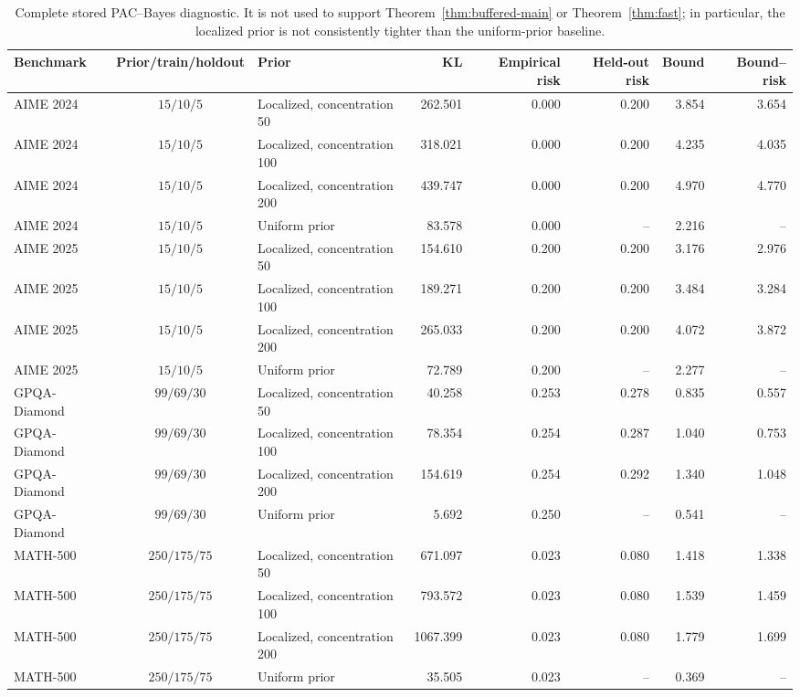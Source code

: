 \begin{table}[p]
\centering
\scriptsize
\setlength{\tabcolsep}{3.5pt}
\begin{tabular}{lclrrrrr}
\toprule
Benchmark & Prior/train/holdout & Prior & KL & Empirical risk & Held-out risk & Bound & Bound--risk \\
\midrule
AIME 2024 & \(15/10/5\) & Localized, concentration 50 & 262.501 & 0.000 & 0.200 & 3.854 & 3.654 \\
AIME 2024 & \(15/10/5\) & Localized, concentration 100 & 318.021 & 0.000 & 0.200 & 4.235 & 4.035 \\
AIME 2024 & \(15/10/5\) & Localized, concentration 200 & 439.747 & 0.000 & 0.200 & 4.970 & 4.770 \\
AIME 2024 & \(15/10/5\) & Uniform prior & 83.578 & 0.000 & -- & 2.216 & -- \\
\midrule
AIME 2025 & \(15/10/5\) & Localized, concentration 50 & 154.610 & 0.200 & 0.200 & 3.176 & 2.976 \\
AIME 2025 & \(15/10/5\) & Localized, concentration 100 & 189.271 & 0.200 & 0.200 & 3.484 & 3.284 \\
AIME 2025 & \(15/10/5\) & Localized, concentration 200 & 265.033 & 0.200 & 0.200 & 4.072 & 3.872 \\
AIME 2025 & \(15/10/5\) & Uniform prior & 72.789 & 0.200 & -- & 2.277 & -- \\
\midrule
GPQA-Diamond & \(99/69/30\) & Localized, concentration 50 & 40.258 & 0.253 & 0.278 & 0.835 & 0.557 \\
GPQA-Diamond & \(99/69/30\) & Localized, concentration 100 & 78.354 & 0.254 & 0.287 & 1.040 & 0.753 \\
GPQA-Diamond & \(99/69/30\) & Localized, concentration 200 & 154.619 & 0.254 & 0.292 & 1.340 & 1.048 \\
GPQA-Diamond & \(99/69/30\) & Uniform prior & 5.692 & 0.250 & -- & 0.541 & -- \\
\midrule
MATH-500 & \(250/175/75\) & Localized, concentration 50 & 671.097 & 0.023 & 0.080 & 1.418 & 1.338 \\
MATH-500 & \(250/175/75\) & Localized, concentration 100 & 793.572 & 0.023 & 0.080 & 1.539 & 1.459 \\
MATH-500 & \(250/175/75\) & Localized, concentration 200 & 1067.399 & 0.023 & 0.080 & 1.779 & 1.699 \\
MATH-500 & \(250/175/75\) & Uniform prior & 35.505 & 0.023 & -- & 0.369 & -- \\
\bottomrule
\end{tabular}
\caption{Complete stored PAC--Bayes diagnostic.  It is not used to support Theorem~\ref{thm:buffered-main} or Theorem~\ref{thm:fast}; in particular, the localized prior is not consistently tighter than the uniform-prior baseline.}
\label{tab:legacy-full-pacbayes}
\end{table}

